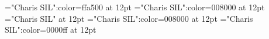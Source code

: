 \documentclass[a4paper]{article}
\begin{document}
\pagestyle{plain}
\sloppy
\setlength{\parfillskip}{0pt plus 1fil}
\font\xitemen="Charis SIL":color=ffa500 at 12pt
\font\xitemenxitem="Charis SIL":color=008000 at 12pt
\font\main="Charis SIL" at 12pt
\font\xitemenmain="Charis SIL":color=008000 at 12pt
\font\xitemxitemmain="Charis SIL":color=0000ff at 12pt

\newpage 
\thispagestyle{empty} 
\mbox{} 
\newpage 
\newpage 
\setcounter{page}{1} 
\pagestyle{fancy} 








\end{document}
